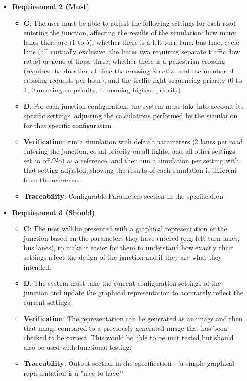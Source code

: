 \documentclass{article}
\begin{document}
\begin{itemize}
    \item \textbf{\underline{Requirement 2 (Must)}}
    \begin{itemize}
        \item \textbf{C}: The user must be able to adjust the following settings for each 
            road entering the junction, affecting the results of the simulation: how many 
            lanes there are (1 to 5), whether there is a left-turn lane, bus lane, cycle 
            lane (all mutually exclusive, the latter two requiring separate traffic flow rates) 
            or none of those three, whether there is a pedestrian crossing (requires the duration 
            of time the crossing is active and the number of crossing requests per hour), 
            and the traffic light sequencing priority (0 to 4, 0 meaning no priority, 4 
            meaning highest priority).
        \item \textbf{D}: For each junction configuration, the system must take into account 
            its specific settings, adjusting the calculations performed by the simulation 
            for that specific configuration
        \item \textbf{Verification}: run a simulation with default parameters (2 lanes per 
            road entering the junction, equal priority on all lights, and all other 
            settings set to off/No) as a reference, and then run a simulation per setting 
            with that setting adjusted, showing the results of each simulation is different 
            from the reference.
        \item\textbf{Traceability}: Configurable Parameters section in the specification
    \end{itemize}

    \item \textbf{\underline{Requirement 3 (Should)}}
    \begin{itemize}
        \item \textbf{C}: The user will be presented with a graphical representation of the junction 
        based on the parameters they have entered (e.g. left-turn lanes, bus lanes), to make it easier 
        for them to understand how exactly their settings affect the design of the junction and if they 
        are what they intended.
        \item \textbf{D}: The system must take the current configuration settings of the junction and 
        update the graphical representation to accurately reflect the current settings. 
        \item \textbf{Verification}: The representation can be generated as an image and then that image 
        compared to a previously generated image that has been checked to be correct. This would be able 
        to be unit tested but should also be used with functional testing.
        \item\textbf{Traceability}: Output section in the specification - 'a simple graphical 
        representation is a "nice-to-have"'
    \end{itemize}


\end{itemize}
\end{document}
